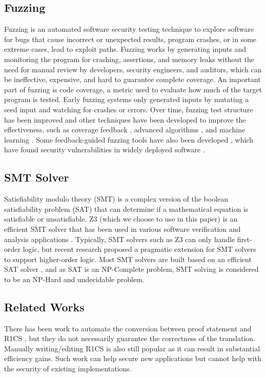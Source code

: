 \subsection{Fuzzing}
Fuzzing is an automated software security testing technique to explore software for bugs that cause incorrect or unexpected results, program crashes, or in some extreme cases, lead to exploit paths. Fuzzing works by generating inputs and monitoring the program for crashing, assertions, and memory leaks \cite{chen2018systematic} without the need for manual review by developers, security engineers, and auditors, which can be ineffective, expensive, and hard to guarantee complete coverage.
An important part of fuzzing is code coverage, a metric used to evaluate how much of the target program is tested.
Early fuzzing systems only generated inputs by mutating a seed input and watching for crashes or errors. Over time, fuzzing test structure has been improved and other techniques have been developed to improve the effectiveness, such as coverage feedback \cite{bohme2016coverage,bohme2017directed}, advanced algorithms \cite{bohme2017directed,householder2012probability,woo2013scheduling}, and machine learning \cite{godefroid2017learn}. Some feedback-guided fuzzing tools have also been developed \cite{afl,syzkaller}, which have found security vulnerabilities in widely deployed software \cite{stevens2017summoning}.

\subsection{SMT Solver}
Satisfiability modulo theory (SMT) is a complex version of the boolean satisfiability problem (SAT) that can determine if a mathematical equation is satisfiable or unsatisfiable.  Z3 (which we choose to use in this paper) is an efficient SMT solver that has been used in various software verification and analysis applications \cite{de2008z3}. Typically, SMT solvers such as Z3 can only handle first-order logic, but recent research \cite{barbosa2019extending} proposed a pragmatic extension for SMT solvers to support higher-order logic.
Most SMT solvers are built based on an efficient SAT solver \cite{de2011satisfiability}, and as SAT is an NP-Complete problem, SMT solving is considered to be an NP-Hard and undecidable problem. 


\subsection{Related Works}
There has been work to automate the conversion between proof statement and R1CS \cite{fredrikson2014zo,snarky,xjsnark,circom}, but they do not necessarily guarantee the correctness of the translation.  Manually writing/editing R1CS is also still popular as it can result in substantial efficiency gains.  Such work can help secure new applications but cannot help with the security of existing implementations.

